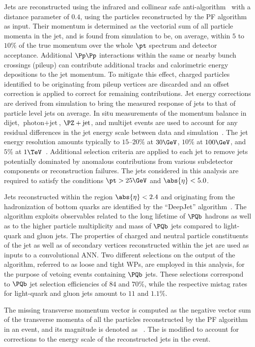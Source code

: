 Jets are reconstructed using the infrared and collinear safe anti-\kt algorithm~\cite{Cacciari:2008gp, Cacciari:2011ma} with a distance parameter of $0.4$,
using the particles reconstructed by the PF algorithm as input.
Their momentum is determined as the vectorial sum of all particle momenta in the jet, 
and is found from simulation to be, on average, within $5$ to $10\%$ of the true momentum over the whole $\pt$ spectrum and detector acceptance.
Additional $\Pp\Pp$ interactions within the same or nearby bunch crossings (pileup) can contribute additional tracks and calorimetric energy depositions to the jet momentum. 
To mitigate this effect, charged particles identified to be originating from pileup vertices are discarded and an offset correction is applied to correct for remaining contributions. 
Jet energy corrections are derived from simulation to bring the measured response of jets to that of particle level jets on average. 
In situ measurements of the momentum balance in dijet, $\text{photon} + \text{jet}$, $\PZ + \text{jet}$, and multijet events 
are used to account for any residual differences in the jet energy scale between data and simulation~\cite{Khachatryan:2016kdb}. 
The jet energy resolution amounts typically to $15$--$20\%$ at $30\GeV$, $10\%$ at $100\GeV$, and $5\%$ at $1\TeV$~\cite{Khachatryan:2016kdb}. 
Additional selection criteria are applied to each jet to remove jets potentially dominated by anomalous contributions from various subdetector components or reconstruction failures.
The jets considered in this analysis are required to satisfy the conditions $\pt > 25\GeV$ and $\abs{\eta} < 5.0$.

Jets reconstructed within the region $\abs{\eta} < 2.4$ and originating from the hadronization of bottom quarks
are identified by the ``DeepJet'' algorithm~\cite{CMS-DP-2017-013}.
The algorithm exploits observables related to the long lifetime of $\Pbottom$ hadrons 
as well as to the higher particle multiplicity and mass of $\Pbottom$ jets compared to light-quark and gluon jets.
The properties of charged and neutral particle constituents of the jet as well as of secondary vertices reconstructed within the jet
are used as inputs to a convolutional ANN.
Two different selections on the output of the algorithm, referred to as loose and tight WPs, are employed in this analysis, 
for the purpose of vetoing events containing $\Pbottom$ jets.
These selections correspond to $\Pbottom$ jet selection efficiencies of $84$ and $70\%$,
while the respective mistag rates for light-quark and gluon jets amount to $11$ and $1.1\%$.

The missing transverse momentum vector \ptvecmiss is computed as the negative vector sum of the transverse momenta of all the particles reconstructed by the PF algorithm in an event, 
and its magnitude is denoted as \ptmiss~\cite{Sirunyan:2019kia}. 
The \ptvecmiss is modified to account for corrections to the energy scale of the reconstructed jets in the event. 

